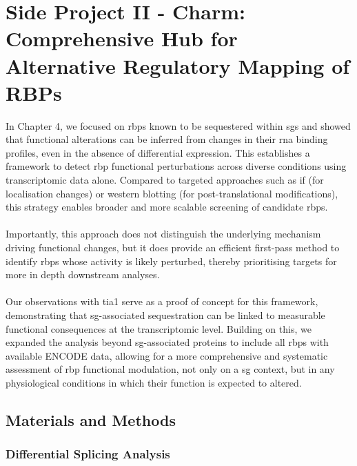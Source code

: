 \chapter{Side Project II - Charm: Comprehensive Hub for Alternative Regulatory Mapping of RBPs}
\label{chap:ChapterIII}

In Chapter 4, we focused on \glspl{rbp} known to be sequestered within \glspl{sg} and showed that functional alterations can be inferred from changes in their \gls{rna} binding profiles, even in the absence of differential expression. This establishes a framework to detect \gls{rbp} functional perturbations across diverse conditions using transcriptomic data alone. Compared to targeted approaches such as \gls{if} (for localisation changes) or western blotting (for post-translational modifications), this strategy enables broader and more scalable screening of candidate \glspl{rbp}.
\\
\\
Importantly, this approach does not distinguish the underlying mechanism driving functional changes, but it does provide an efficient first-pass method to identify \glspl{rbp} whose activity is likely perturbed, thereby prioritising targets for more in depth downstream analyses.
\\
\\
Our observations with \gls{tia1} serve as a proof of concept for this framework, demonstrating that \gls{sg}-associated sequestration can be linked to measurable functional consequences at the transcriptomic level. Building on this, we expanded the analysis beyond \gls{sg}-associated proteins to include all \glspl{rbp} with available ENCODE data\cite{the_encode_project_consortium_integrated_2012}, allowing for a more comprehensive and systematic assessment of \gls{rbp} functional modulation, not only on a \gls{sg} context, but in any physiological conditions in which their function is expected to altered.

\section{Materials and Methods}

\subsection{Differential Splicing Analysis}

